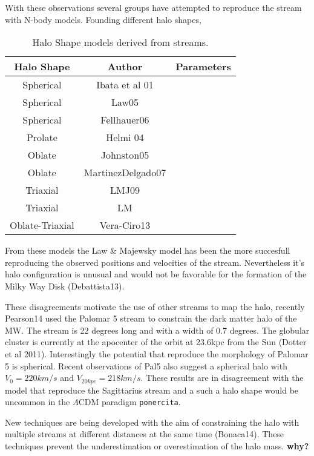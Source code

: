 
With these observations several groups have attempted to reproduce the
stream with N-body models. Founding different halo shapes,

\begin{table}
\begin{center}
\begin{tabular}{c c c}
\hline
\hline
Halo Shape & Author & Parameters \\
\hline
Spherical & Ibata et al 01 & \\
Spherical & Law05 & \\
Spherical & Fellhauer06 & \\
Prolate & Helmi 04 & \\
Oblate & Johnston05 & \\
Oblate & MartinezDelgado07 & \\
Triaxial & LMJ09 & \\
Triaxial & LM & \\
Oblate-Triaxial & Vera-Ciro13 & \\
\hline
\hline
\end{tabular}
\caption{Halo Shape models derived from streams.}
\end{center}
\end{table}

From these models the Law \& Majewsky model has been 
the more succesfull reproducing the observed positions and velocities
of the stream. Nevertheless it's halo configuration is unusual and would 
not be favorable for the formation of the Milky Way Disk (Debattista13).

These disagreements motivate the use of other streams to map the halo,
recently Pearson14 used the Palomar 5 stream to constrain the dark
matter halo of the MW. The stream is 22 degrees
long and with a width of 0.7 degrees. The globular cluster is currently at the
apocenter of the orbit at 23.6kpc from the Sun (Dotter et al 2011). Interestingly
the potential that reproduce the morphology of Palomar 5 is spherical.
Recent observations of Pal5 \citep{Fritz15} also suggest a spherical
halo with $V_0 = 220 km/s$ and $V_{20kpc} = 218 km/s$. These results
are in disagreement with the \citep{LawMajewsky} model that reproduce the Sagittarius stream
and a such a halo shape would be uncommon in the $\Lambda$CDM
paradigm \verb+ponercita+.

New techniques are being developed with the aim of constraining the halo with multiple
streams at different distances at the same time (Bonaca14). These techniques 
prevent the underestimation or overestimation of the halo mass.
\textbf{why?}

